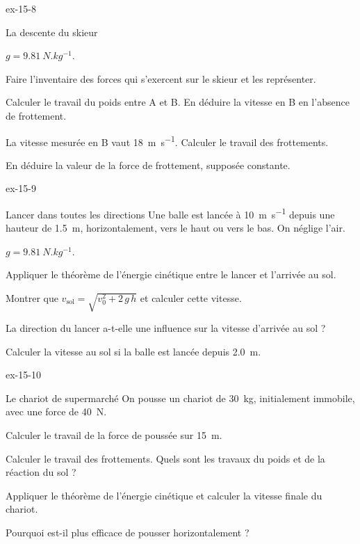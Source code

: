 \begin{blocLivre}{ex-15-8}
\begin{exercice}[2]{La descente du skieur}
\begin{donnees}
$g=\qty{9,81}{N.kg^{-1}}$.
\end{donnees}
\begin{questions}
\item Faire l'inventaire des forces qui s'exercent sur le skieur et les représenter.
\item Calculer le travail du poids entre A et B. En déduire la vitesse en B en l'absence de frottement.
\item La vitesse mesurée en B vaut \qty{18}{m.s^{-1}}. Calculer le travail des frottements.
\item En déduire la valeur de la force de frottement, supposée constante.
\end{questions}
\end{exercice}
\end{blocLivre}
\begin{blocLivre}{ex-15-9}
\begin{exercice}[2]{Lancer dans toutes les directions}
Une balle est lancée à \qty{10}{m.s^{-1}} depuis une hauteur de \qty{1,5}{m}, horizontalement, vers le haut ou vers le bas. On néglige l'air.
\begin{donnees}
$g=\qty{9,81}{N.kg^{-1}}$.
\end{donnees}
\begin{questions}
\item Appliquer le théorème de l'énergie cinétique entre le lancer et l'arrivée au sol.
\item Montrer que $v_\mathrm{sol}=\sqrt{v_0^2+2\,g\,h}$ et calculer cette vitesse.
\item La direction du lancer a-t-elle une influence sur la vitesse d'arrivée au sol ?
\item Calculer la vitesse au sol si la balle est lancée depuis \qty{2,0}{m}.
\end{questions}
\end{exercice}
\end{blocLivre}
\begin{blocLivre}{ex-15-10}
\begin{exercice}[2]{Le chariot de supermarché}
On pousse un chariot de \qty{30}{kg}, initialement immobile, avec une force de \qty{40}{N}.
\begin{questions}
\item Calculer le travail de la force de poussée sur \qty{15}{m}.
\item Calculer le travail des frottements. Quels sont les travaux du poids et de la réaction du sol ?
\item Appliquer le théorème de l'énergie cinétique et calculer la vitesse finale du chariot.
\item Pourquoi est-il plus efficace de pousser horizontalement ?
\end{questions}
\end{exercice}
\end{blocLivre}
